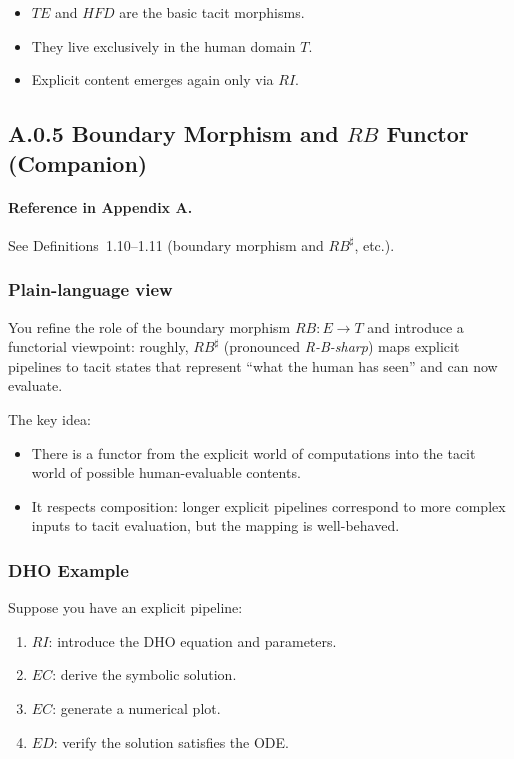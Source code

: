 \begin{itemize}
 \item $TE$ and $HFD$ are the basic tacit morphisms.
 \item They live exclusively in the human domain $T$.
 \item Explicit content emerges again only via $RI$.
\end{itemize}

\newpage

\subsection{A.0.5 Boundary Morphism and $RB$ Functor (Companion)}

\paragraph{Reference in Appendix A.}
See Definitions~1.10--1.11 (boundary morphism and $RB^\sharp$, etc.).

\subsubsection*{Plain-language view}

You refine the role of the boundary morphism $RB : E \to T$ and introduce a functorial viewpoint:
roughly, $RB^\sharp$ (pronounced \emph{R-B-sharp}) maps explicit pipelines to tacit states that represent
``what the human has seen'' and can now evaluate.

The key idea:

\begin{itemize}
 \item There is a functor from the explicit world of computations into the tacit world of possible
 human-evaluable contents.
 \item It respects composition: longer explicit pipelines correspond to more complex inputs to tacit
 evaluation, but the mapping is well-behaved.
\end{itemize}

\subsubsection*{DHO Example}

Suppose you have an explicit pipeline:

\begin{enumerate}
 \item $RI$: introduce the DHO equation and parameters.
 \item $EC$: derive the symbolic solution.
 \item $EC$: generate a numerical plot.
 \item $ED$: verify the solution satisfies the ODE.
\end{enumerate}

